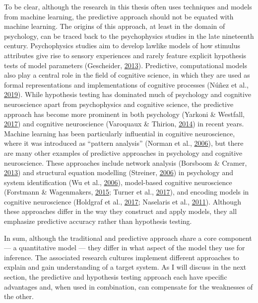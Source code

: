 \documentclass[12pt,american,a4paper,oneside,]{memoir} %
\begin{document}
To be clear, although the research in this thesis often uses techniques and models from machine learning, the predictive approach should not be equated with machine learning. The origins of this approach, at least in the domain of psychology, can be traced back to the psychophysics studies in the late nineteenth century. Psychophysics studies aim to develop lawlike models of how stimulus attributes give rise to sensory experiences and rarely feature explicit hypothesis tests of model parameters (Gescheider, \protect\hyperlink{ref-Gescheider2013-zm}{2013}). Predictive, computational models also play a central role in the field of cognitive science, in which they are used as formal representations and implementations of cognitive processes (Núñez et al., \protect\hyperlink{ref-Nunez2019-lh}{2019}). While hypothesis testing has dominated much of psychology and cognitive neuroscience apart from psychophysics and cognitive science, the predictive approach has become more prominent in both psychology (Yarkoni \& Westfall, \protect\hyperlink{ref-Yarkoni2017-om}{2017}) and cognitive neuroscience (Varoquaux \& Thirion, \protect\hyperlink{ref-Varoquaux2014-su}{2014}) in recent years. Machine learning has been particularly influential in cognitive neuroscience, where it was introduced as ``pattern analysis'' (Norman et al., \protect\hyperlink{ref-norman2006beyond}{2006}), but there are many other examples of predictive approaches in psychology and cognitive neuroscience. These approaches include network analysis (Borsboom \& Cramer, \protect\hyperlink{ref-Borsboom2013-wb}{2013}) and structural equation modelling (Streiner, \protect\hyperlink{ref-Streiner2006-ze}{2006}) in psychology and system identification (Wu et al., \protect\hyperlink{ref-Wu2006-qs}{2006}), model-based cognitive neuroscience (Forstmann \& Wagenmakers, \protect\hyperlink{ref-Forstmann2015-rz}{2015}; Turner et al., \protect\hyperlink{ref-Turner2017-fi}{2017}), and encoding models in cognitive neuroscience (Holdgraf et al., \protect\hyperlink{ref-Holdgraf2017-eu}{2017}; Naselaris et al., \protect\hyperlink{ref-Naselaris2011-oh}{2011}). Although these approaches differ in the way they construct and apply models, they all emphasize predictive accuracy rather than hypothesis testing.

In sum, although the traditional and predictive approach share a core component --- a quantitative model --- they differ in what aspect of the model they use for inference. The associated research cultures implement different approaches to explain and gain understanding of a target system. As I will discuss in the next section, the predictive and hypothesis testing approach each have specific advantages and, when used in combination, can compensate for the weaknesses of the other.
\end{document}
